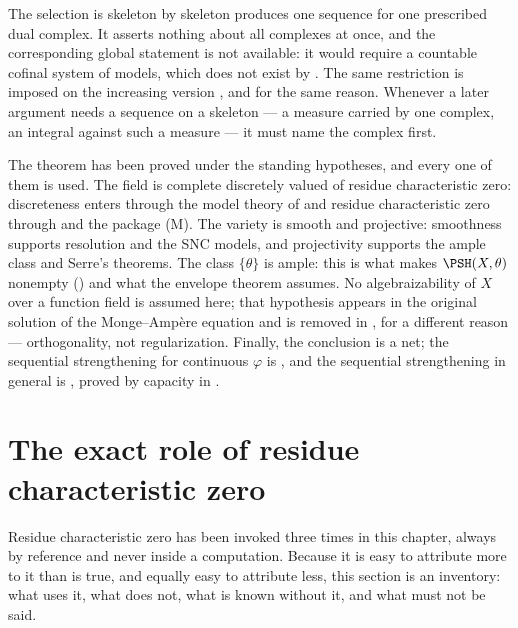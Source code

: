 \begin{warning}{The selection is skeleton by skeleton}
 produces one sequence for one
prescribed dual complex.  It asserts nothing about all complexes at once,
and the corresponding global statement is not available: it would require a
countable cofinal system of models, which does not exist by
.  The same restriction is imposed on the
increasing version , and for the
same reason.  Whenever a later argument needs a sequence on a skeleton --- a
measure carried by one complex, an integral against such a measure --- it
must name the complex first.
\end{warning}

\begin{remark}
\label{rem:ch22-regularization-hypotheses}
The theorem has been proved under the standing hypotheses, and every one of
them is used.  The field is complete discretely valued of residue
characteristic zero: discreteness enters through the model theory of
 and residue characteristic zero through
 and the package \textup{(M)}.  The variety is smooth
and projective: smoothness supports resolution and the SNC models, and
projectivity supports the ample class and Serre's theorems.  The class
\(\{\theta\}\) is ample: this is what makes
\(\PSH(X,\theta)\) nonempty () and
what the envelope theorem assumes.  No algebraizability of \(X\) over a
function field is assumed here; that hypothesis appears in the original
solution of the Monge--Amp\`ere equation and is removed in
, for a different reason ---
orthogonality, not regularization.  Finally, the conclusion is a net; the
sequential strengthening for continuous \(\varphi\) is
, and the sequential
strengthening in general is , proved
by capacity in .
\end{remark}

\section{The exact role of residue characteristic zero}
\label{sec:ch22-char-zero}

Residue characteristic zero has been invoked three times in this chapter,
always by reference and never inside a computation.  Because it is easy to
attribute more to it than is true, and equally easy to attribute less, this
section is an inventory: what uses it, what does not, what is known without
it, and what must not be said.

